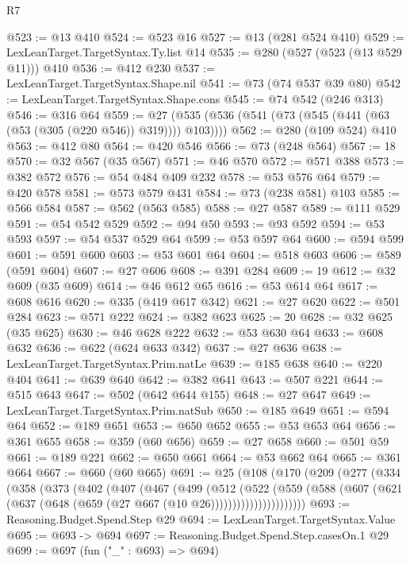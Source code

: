 \begin{lexlean}{R7}
\begin{coremodule}
{{{{{{{{{{{{{{{{{{{{{{{{{{{{{{{{{{{{{{{{{{@523 := @13 @410
@524 := @523 @16
@527 := @13 (@281 @524 @410)
@529 := LexLeanTarget.TargetSyntax.Ty.list @14
@535 := @280 (@527 (@523 (@13 @529 @11))) @410
@536 := @412 @230
@537 := LexLeanTarget.TargetSyntax.Shape.nil
@541 := @73 (@74 @537 @39 @80)
@542 := LexLeanTarget.TargetSyntax.Shape.cons
@545 := @74 @542 (@246 @313)
@546 := @316 @64
@559 := @27 (@535 (@536 (@541 (@73 (@545 (@441 (@63 (@53 (@305 (@220 @546)) @319)))) @103))))
@562 := @280 (@109 @524) @410
@563 := @412 @80
@564 := @420 @546
@566 := @73 (@248 @564)
@567 := 18
@570 := @32 @567 (@35 @567)
@571 := @46 @570
@572 := @571 @388
@573 := @382 @572
@576 := @54 @484 @409 @232
@578 := @53 @576 @64
@579 := @420 @578
@581 := @573 @579 @431
@584 := @73 (@238 @581) @103
@585 := @566 @584
@587 := @562 (@563 @585)
@588 := @27 @587
@589 := @111 @529
@591 := @54 @542 @529
@592 := @94 @50
@593 := @93 @592
@594 := @53 @593
@597 := @54 @537 @529 @64
@599 := @53 @597 @64
@600 := @594 @599
@601 := @591 @600
@603 := @53 @601 @64
@604 := @518 @603
@606 := @589 (@591 @604)
@607 := @27 @606
@608 := @391 @284
@609 := 19
@612 := @32 @609 (@35 @609)
@614 := @46 @612 @65
@616 := @53 @614 @64
@617 := @608 @616
@620 := @335 (@419 @617 @342)
@621 := @27 @620
@622 := @501 @284
@623 := @571 @222
@624 := @382 @623
@625 := 20
@628 := @32 @625 (@35 @625)
@630 := @46 @628 @222
@632 := @53 @630 @64
@633 := @608 @632
@636 := @622 (@624 @633 @342)
@637 := @27 @636
@638 := LexLeanTarget.TargetSyntax.Prim.natLe
@639 := @185 @638
@640 := @220 @404
@641 := @639 @640
@642 := @382 @641
@643 := @507 @221
@644 := @515 @643
@647 := @502 (@642 @644 @155)
@648 := @27 @647
@649 := LexLeanTarget.TargetSyntax.Prim.natSub
@650 := @185 @649
@651 := @594 @64
@652 := @189 @651
@653 := @650 @652
@655 := @53 @653 @64
@656 := @361 @655
@658 := @359 (@60 @656)
@659 := @27 @658
@660 := @501 @59
@661 := @189 @221
@662 := @650 @661
@664 := @53 @662 @64
@665 := @361 @664
@667 := @660 (@60 @665)
@691 := @25
    (@108
      (@170
        (@209
          (@277
            (@334
              (@358
                (@373
                  (@402
                    (@407
                      (@467
                        (@499
                          (@512
                            (@522
                              (@559
                                (@588
                                  (@607
                                    (@621 (@637 (@648 (@659 (@27 @667 (@10 @26))))))))))))))))))))))
@693 := Reasoning.Budget.Spend.Step @29
@694 := LexLeanTarget.TargetSyntax.Value
@695 := @693 -> @694
@697 := Reasoning.Budget.Spend.Step.casesOn.{1} @29
@699 := @697 (fun ("_" : @693) => @694)
}}}}}}}}}}}}}}}}}}}}}}}}}}}}}}}}}}}}}}}}}}
\end{coremodule}
\end{lexlean}
